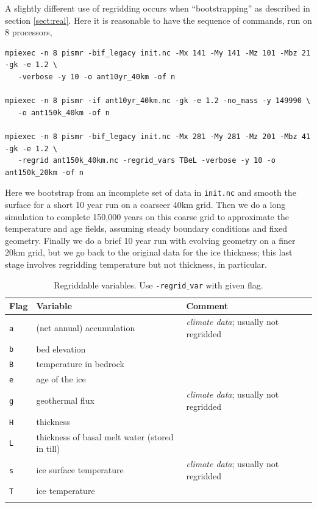 \documentclass[11pt,final]{amsart}
\begin{document}
A slightly different use of regridding occurs when ``bootstrapping'' as described in section \ref{sect:real}.  Here it is reasonable to have the sequence of commands, run on 8 processors,
\small
\begin{verbatim}
mpiexec -n 8 pismr -bif_legacy init.nc -Mx 141 -My 141 -Mz 101 -Mbz 21 -gk -e 1.2 \
   -verbose -y 10 -o ant10yr_40km -of n

mpiexec -n 8 pismr -if ant10yr_40km.nc -gk -e 1.2 -no_mass -y 149990 \
   -o ant150k_40km -of n

mpiexec -n 8 pismr -bif_legacy init.nc -Mx 281 -My 281 -Mz 201 -Mbz 41 -gk -e 1.2 \
   -regrid ant150k_40km.nc -regrid_vars TBeL -verbose -y 10 -o ant150k_20km -of n
\end{verbatim}
\normalsize
Here we bootstrap from an incomplete set of data in \verb|init.nc| and smooth the surface for a short 10 year run on a coarseer 40km grid.  Then we do a long simulation to complete 150,000 years on this coarse grid to approximate the temperature and age fields, assuming steady boundary conditions and fixed geometry.  Finally we do a brief 10 year run with evolving geometry on a finer 20km grid, but we go back to the original data for the ice thickness; this last stage involves regridding temperature but not thickness, in particular.


\begin{table}[h]
\caption{Regriddable variables.  Use \texttt{-regrid$\underline{\phantom{b}}$var} with given flag.}\label{tab:regridvar}
\begin{tabular}{@{}llll}\hline
\textbf{Flag} & \textbf{Variable} & \textbf{Comment}\\ \hline
\verb|a| & (net annual) accumulation & \emph{climate data}; usually not regridded \\
\verb|b| & bed elevation & \\
\verb|B| & temperature in bedrock & \\
\verb|e| & age of the ice & \\
\verb|g| & geothermal flux & \emph{climate data}; usually not regridded \\
\verb|H| & thickness & \\
\verb|L| & thickness of basal melt water (stored in till) & \\
\verb|s| & ice surface temperature & \emph{climate data}; usually not regridded\\
\verb|T| & ice temperature & \\
\hline
\normalsize
\end{tabular}
\end{table}
\end{document}
